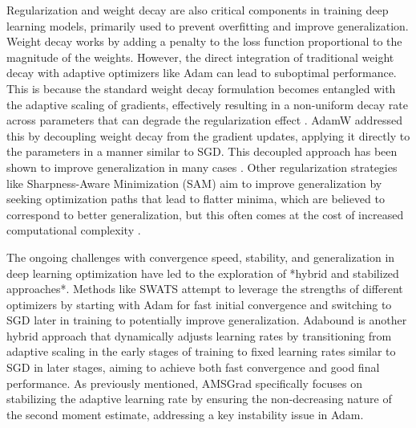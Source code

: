 \documentclass{article}
\begin{document}
Regularization and weight decay are also critical components in training deep learning models, primarily used to prevent overfitting and improve generalization. Weight decay works by adding a penalty to the loss function proportional to the magnitude of the weights. However, the direct integration of traditional weight decay with adaptive optimizers like Adam can lead to suboptimal performance. This is because the standard weight decay formulation becomes entangled with the adaptive scaling of gradients, effectively resulting in a non-uniform decay rate across parameters that can degrade the regularization effect \cite{Loshchilov2017, B1}. AdamW \cite{Loshchilov2017} addressed this by decoupling weight decay from the gradient updates, applying it directly to the parameters in a manner similar to SGD. This decoupled approach has been shown to improve generalization in many cases \cite{Loshchilov2017, B2}. Other regularization strategies like Sharpness-Aware Minimization (SAM) \cite{Foret2021} aim to improve generalization by seeking optimization paths that lead to flatter minima, which are believed to correspond to better generalization, but this often comes at the cost of increased computational complexity \cite{Foret2021, B3}.

The ongoing challenges with convergence speed, stability, and generalization in deep learning optimization have led to the exploration of *hybrid and stabilized approaches*. Methods like SWATS \cite{Keskar2017} attempt to leverage the strengths of different optimizers by starting with Adam for fast initial convergence and switching to SGD later in training to potentially improve generalization. Adabound \cite{Luo2019} is another hybrid approach that dynamically adjusts learning rates by transitioning from adaptive scaling in the early stages of training to fixed learning rates similar to SGD in later stages, aiming to achieve both fast convergence and good final performance. As previously mentioned, AMSGrad \cite{Reddi2018} specifically focuses on stabilizing the adaptive learning rate by ensuring the non-decreasing nature of the second moment estimate, addressing a key instability issue in Adam.
\end{document}
